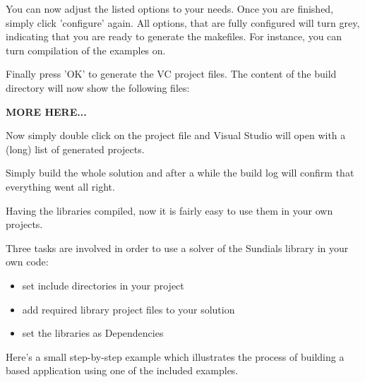 You can now adjust the listed options to your needs. Once you are finished, 
simply click 'configure' again. All options, that are fully configured will turn grey, 
indicating that you are ready to generate the makefiles. For instance, you can turn 
compilation of the examples on.

Finally press 'OK' to generate the VC project files. The content of the build directory 
will now show the following files:


{\bf MORE HERE...}



Now simply double click on the  project file and Visual Studio 
will open with a (long) list of generated projects.

Simply build the whole solution and after a while the build log will confirm that 
everything went all right.

Having the libraries compiled, now it is fairly easy to use them in your own projects.

Three tasks are involved in order to use a solver of the Sundials library in your own code:
\begin{itemize}
\item set include directories in your project
\item add required {\sundials} library project files to your solution
\item set the {\sundials} libraries as Dependencies
\end{itemize}

Here's a small step-by-step example which illustrates the process of building 
a {\cvode} based application using one of the included examples. 

